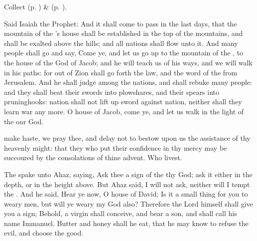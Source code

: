 \begin{rubric}
     Collect  (p. \pageref{AdventICollect}) \&   (p. \pageref{SPMaryInAdvent}).
\end{rubric}

 Said Isaiah the Prophet: And it shall come to pass in the last days, that the mountain of the 's house shall be established in the top of the mountains, and shall be exalted above the hills; and all nations shall flow unto it. And many people shall go and say, Come ye, and let us go up to the mountain of the , to the house of the God of Jacob; and he will teach us of his ways, and we will walk in his paths: for out of Zion shall go forth the law, and the word of the  from Jerusalem. And he shall judge among the nations, and shall rebuke many people: and they shall beat their swords into plowshares, and their spears into pruninghooks: nation shall not lift up sword against nation, neither shall they learn war any more. O house of Jacob, come ye, and let us walk in the light of the  our God. %
\\


\collect
{} make haste, we pray thee, and delay not to bestow upon us the assistance of thy heavenly might: that they who put their confidence in thy mercy may be succoured by the consolations of thine advent. Who livest.

 The  spake unto Ahaz, saying, Ask thee a sign of the  thy God; ask it either in the depth, or in the height above. But Ahaz said, I will not ask, neither will I tempt the . And he said, Hear ye now, O house of David; Is it a small thing for you to weary men, but will ye weary my God also? Therefore the Lord himself shall give you a sign; Behold, a virgin shall conceive, and bear a son, and shall call his name Immanuel. Butter and honey shall he eat, that he may know to refuse the evil, and choose the good.

